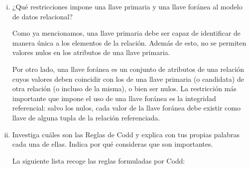\begin{enumerate}[i.]
	      Si nos enfocamos en superllaves que no contienen información redundante, llegamos al concepto de llave mínima:
	      es un conjunto de atributos que permiten identificar unívocamente a los elementos de la relación, y tal que quitar cualquier atributo de la llave rompe esta propiedad.

	      Una llave candidata es una llave mínima; se le llama candidata porque cualquiera de ellas puede elegirse como llave primaria.

	      Finalmente, una llave primaria es una llave candidata elegida por el diseñador para identificar a los elementos de la relación. Su valor es el que las llaves foráneas de otras relaciones referencian para vincular tuplas.


	\item ¿Qué restricciones impone una llave primaria y una llave foránea al modelo de datos relacional?

	      Como ya mencionamos, una llave primaria debe ser capaz de identificar de manera única a los elementos de la relación. Además de esto, no se permiten valores nulos en los atributos de una llave primaria.

	      Por otro lado, una llave foránea es un conjunto de atributos de una relación cuyos valores deben coincidir con los de una llave primaria (o candidata) de otra relación (o incluso de la misma), o bien ser nulos.
	      La restricción más importante que impone el uso de una llave foránea es la integridad referencial: salvo los nulos, cada valor de la llave foránea debe existir como llave de alguna tupla de la relación referenciada.


	\item Investiga cuáles son las Reglas de Codd y explica con tus propias palabras cada una de ellas. Indica por qué consideras que son importantes.


	      La siguiente lista recoge las reglas formuladas por Codd:


\end{enumerate}
